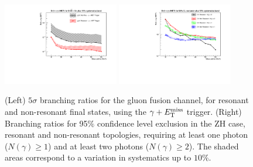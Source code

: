 \begin{figure}[htbp]
\centering
\includegraphics[width=0.45\textwidth]{finalresults/branchingratio_ggh.pdf}
\includegraphics[width=0.45\textwidth]{finalresults/exclusion_zh.pdf}
\caption{(Left) $5\sigma$ branching ratios for the gluon fusion channel, for resonant and non-resonant final states, using the $\gamma+E_{\mathrm{T}}^{\text{miss}}$ trigger. (Right) Branching ratios for 95$\%$ confidence level exclusion in the ZH case, resonant and non-resonant topologies, requiring at least one photon ($N(\gamma) \geq 1$) and at least two photons ($N(\gamma) \geq 2$). The shaded areas correspond to a variation in systematics up to $10\%$.}
\label{fig:branching_5sigma}
\end{figure}
